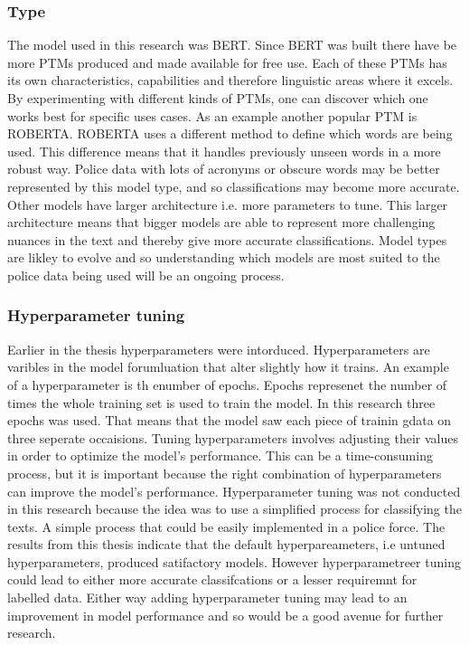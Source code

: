 \subsubsection{Type} The model used in this research was BERT. Since BERT was built there have be more PTMs produced and made available for free use.  Each of these PTMs has its own characteristics, capabilities and therefore linguistic areas where it excels. By experimenting with different kinds of PTMs, one can discover which one works best for specific uses cases. As an example another popular PTM is ROBERTA. ROBERTA uses a different method to define which words are being used. This difference means  that  it handles previously unseen words in a more robust way. Police data with lots of acronyms or obscure words may be better represented by this model type, and so classifications may become more accurate. Other models have larger architecture i.e. more parameters to tune. This larger architecture means that bigger models are able to represent more challenging nuances in the text and thereby give more accurate classifications.  Model types are likley to evolve and so understanding which models are most suited to the police data being used will be an ongoing process.

\subsubsection{Hyperparameter tuning} Earlier in the thesis hyperparameters were intorduced. Hyperparameters are varibles in the model forumluation that alter slightly how it trains. An example of a hyperparameter is th enumber of epochs. Epochs represenet the number of times the whole training set is used to train the model. In this research three epochs was used. That means that the model saw each piece of trainin gdata on three seperate occaisions. Tuning hyperparameters involves adjusting their values in order to optimize the model's performance. This can be a time-consuming process, but it is important because the right combination of hyperparameters can improve the model's performance. Hyperparameter tuning was not conducted in this research because the idea was to use a simplified process for classifying the texts. A simple process that could be easily implemented in a police force.  The results from this thesis indicate that the default hyperpareameters, i.e untuned hyperparameters, produced satifactory models. However hyperparametreer tuning could lead to either more accurate classifcations or  a lesser requiremnt for labelled data. Either way adding hyperparameter tuning may lead to an improvement in model performance and so would be a good avenue for further research. 

